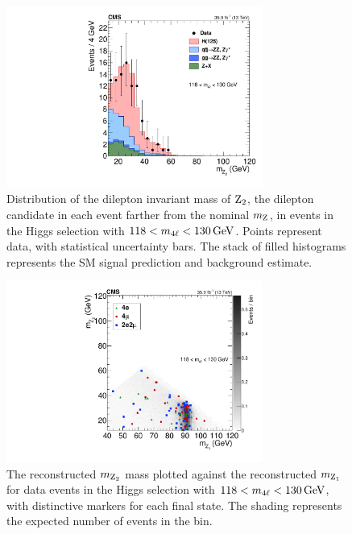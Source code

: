 \begin{figure}[htbp]
  \begin{center}
    \includegraphics[width=0.75\textwidth]{results/hzzz2Mass.pdf}
    \caption[Mass of $\PZ_2$ candidates in events near the Higgs resonance]{
        Distribution of the dilepton invariant mass of $\PZ_2$, the dilepton candidate in each event farther from the nominal $m_\mathrm{Z}$, in events in the Higgs selection with $118 < m_{4\ell} < 130\,\mathrm{Ge\hspace{-.08em}V}$.
        Points represent data, with statistical uncertainty bars.
        The stack of filled histograms represents the SM signal prediction and background estimate.
      }\label{fig:z2Mass_hzz}
  \end{center}
\end{figure}

\begin{figure}[htbp]
  \begin{center}
    \includegraphics[width=0.75\textwidth]{results/mZ2VsmZ1_hzz.pdf}
    \caption[Scatter plot of $m_{\PZ_2}$ vs.\ $m_{\PZ_1}$ for data events near the Higgs resonance]{
        The reconstructed $m_{\PZ_2}$ mass plotted against the reconstructed $m_{\PZ_1}$ for data events in the Higgs selection with $118 < m_{4\ell} < 130\,\mathrm{Ge\hspace{-.08em}V}$, with distinctive markers for each final state.
        The shading represents the expected number of events in the bin.
      }\label{fig:mZ2VsmZ1_hzz}
  \end{center}
\end{figure}


